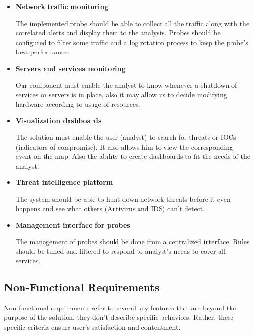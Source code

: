 \begin{itemize}[label={$\checkmark$}]

\item \textbf{Network traffic monitoring} 

The implemented probe should be able to collect all the traffic along with the correlated alerts and display them to the analysts. Probes should be configured to filter some traffic and a log rotation process to keep the probe's best performance.


\item \textbf{Servers and services monitoring} 

Our component must enable the analyst to know whenever a shutdown of services or servers is in place, also it may allow us to decide modifying hardware according to usage of resources.

\item \textbf{Visualization dashboards } 

The solution must enable the user (analyst) to search for threats or IOCs (indicators of compromise). It also allows him to view the corresponding event on the map. Also the ability to create dashboards to fit the needs of the analyst. 

\item \textbf{Threat intelligence platform} 

The system should be able to hunt down network threats before it even happens and see what others (Antivirus and IDS) can't detect.

\item \textbf{Management interface for probes} 

The management of probes should be done from a centralized interface. Rules should be tuned and filtered to respond to analyst's needs to cover all services. 

\end{itemize}

\subsection{Non-Functional Requirements}

Non-functional requirements refer to several key features that are beyond the purpose of the solution, they don't describe specific behaviors. Rather, these specific criteria ensure user's satisfaction and contentment.

